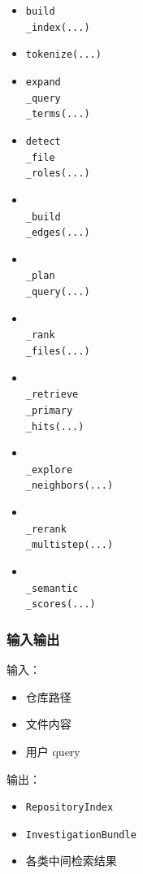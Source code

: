 \documentclass[UTF8,12pt,openany]{ctexbook}
\begin{document}
\begin{itemize}
\item \texttt{build\\_index(...)}
\item \texttt{tokenize(...)}
\item \texttt{expand\\_query\\_terms(...)}
\item \texttt{detect\\_file\\_roles(...)}
\item \texttt{\\_build\\_edges(...)}
\item \texttt{\\_plan\\_query(...)}
\item \texttt{\\_rank\\_files(...)}
\item \texttt{\\_retrieve\\_primary\\_hits(...)}
\item \texttt{\\_explore\\_neighbors(...)}
\item \texttt{\\_rerank\\_multistep(...)}
\item \texttt{\\_semantic\\_scores(...)}
\end{itemize}

\subsubsection{输入输出}

输入：\par

\begin{itemize}
\item 仓库路径
\item 文件内容
\item 用户 query
\end{itemize}

输出：\par

\begin{itemize}
\item \texttt{RepositoryIndex}
\item \texttt{InvestigationBundle}
\item 各类中间检索结果
\end{itemize}
\end{document}
